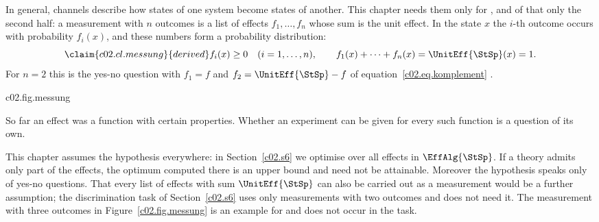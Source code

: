 

In general, channels describe how states of one system become states of another. This
chapter needs them only for , and of that only the second half: a measurement
with $n$ outcomes is a list of effects $f_1, \dots, f_n$ whose sum is the unit effect. In
the state $x$ the $i$-th outcome occurs with probability $f_i(x)$, and these numbers form a
probability distribution:
\begin{equation}\label{c02.eq.messung}\claim{c02.cl.messung}{derived}
  f_i(x) \geq 0 \quad (i = 1, \dots, n),
  \qquad f_1(x) + \dots + f_n(x) = \UnitEff{\StSp}(x) = 1 .
\end{equation}
For $n = 2$ this is the yes-no question with $f_1 = f$ and $f_2 = \UnitEff{\StSp} - f$ of
equation~\eqref{c02.eq.komplement}
.

\begin{tpcfigure}{c02.fig.messung}
  \caption{A measurement with three outcomes on the classical bit. The effects are $f_1 = (\tfrac12, 0)$, $f_2 = (\tfrac12, \tfrac12)$ and $f_3 = (0, \tfrac12)$ in the coordinates $(q_0, q_1)$; their sum is $(1,1) = \UnitEff{\StSp}$. Above every state the three probabilities are stacked; together they fill the height $1$. In the state $x = (\tfrac34, \tfrac14)$ they are $\tfrac38$, $\tfrac12$ and $\tfrac18$.}
\end{tpcfigure}

So far an effect was a function with certain properties. Whether an experiment can be
given for every such function is a question of its own.


This chapter assumes the hypothesis everywhere: in Section~\ref{c02.s6} we optimise over
all effects in $\EffAlg{\StSp}$. If a theory admits only part of the effects, the optimum
computed there is an upper bound and need not be attainable. Moreover the hypothesis
speaks only of yes-no questions. That every list of effects with sum $\UnitEff{\StSp}$ can
also be carried out as a measurement would be a further assumption; the discrimination
task of Section~\ref{c02.s6} uses only measurements with two outcomes and does not need
it. The measurement with three outcomes in
Figure~\ref{c02.fig.messung} is an example for  and does not occur in the
task.

